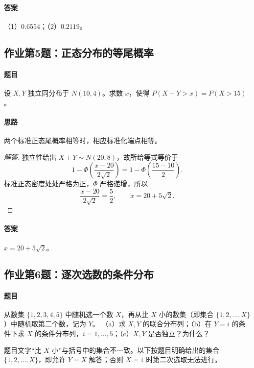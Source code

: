 \paragraph{答案}（1）$0.6554$；（2）$0.2119$。

\subsection{作业第5题：正态分布的等尾概率}\label{ex:w11-h5}
\paragraph{题目}
设 $X,Y$ 独立同分布于 $N(10,4)$。求数 $x$，使得 $P(X+Y>x)=P(X>15)$。
\paragraph{思路}两个标准正态尾概率相等时，相应标准化端点相等。
\begin{proof}[解答]
独立性给出 $X+Y\sim N(20,8)$，故所给等式等价于
\[
1-\Phi\left(\frac{x-20}{2\sqrt2}\right)
=1-\Phi\left(\frac{15-10}{2}\right).
\]
标准正态密度处处严格为正，$\Phi$ 严格递增，所以
\[
\frac{x-20}{2\sqrt2}=\frac52,
\qquad x=20+5\sqrt2.
\]
\end{proof}
\paragraph{答案}$x=20+5\sqrt2$。

\subsection{作业第6题：逐次选数的条件分布}\label{ex:w11-h6}
\paragraph{题目}
从数集 $\{1,2,3,4,5\}$ 中随机选一个数 $X$，再从比 $X$ 小的数集（即集合 $\{1,2,\ldots,X\}$）中随机取第二个数，记为 $Y$。
（a）求 $X,Y$ 的联合分布列；（b）在 $Y=i$ 的条件下求 $X$ 的条件分布列，$i=1,\ldots,5$；（c）$X,Y$ 是否独立？为什么？

题目文字“比 $X$ 小”与括号中的集合不一致。以下按题目明确给出的集合 $\{1,2,\ldots,X\}$，即允许 $Y=X$ 解答；否则 $X=1$ 时第二次选取无法进行。
